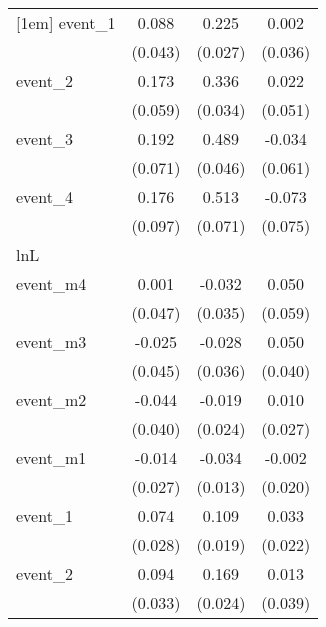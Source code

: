 {\begin{tabular}{l*{3}{c}}
[1em]
event\_1     &       0.088\sym{*}  &       0.225\sym{***}&       0.002         \\
            &     (0.043)         &     (0.027)         &     (0.036)         \\
[1em]
event\_2     &       0.173\sym{**} &       0.336\sym{***}&       0.022         \\
            &     (0.059)         &     (0.034)         &     (0.051)         \\
[1em]
event\_3     &       0.192\sym{**} &       0.489\sym{***}&      -0.034         \\
            &     (0.071)         &     (0.046)         &     (0.061)         \\
[1em]
event\_4     &       0.176         &       0.513\sym{***}&      -0.073         \\
            &     (0.097)         &     (0.071)         &     (0.075)         \\
\hline
lnL         &                     &                     &                     \\
event\_m4    &       0.001         &      -0.032         &       0.050         \\
            &     (0.047)         &     (0.035)         &     (0.059)         \\
[1em]
event\_m3    &      -0.025         &      -0.028         &       0.050         \\
            &     (0.045)         &     (0.036)         &     (0.040)         \\
[1em]
event\_m2    &      -0.044         &      -0.019         &       0.010         \\
            &     (0.040)         &     (0.024)         &     (0.027)         \\
[1em]
event\_m1    &      -0.014         &      -0.034\sym{**} &      -0.002         \\
            &     (0.027)         &     (0.013)         &     (0.020)         \\
[1em]
event\_1     &       0.074\sym{**} &       0.109\sym{***}&       0.033         \\
            &     (0.028)         &     (0.019)         &     (0.022)         \\
[1em]
event\_2     &       0.094\sym{**} &       0.169\sym{***}&       0.013         \\
            &     (0.033)         &     (0.024)         &     (0.039)         \\

\end{tabular}}

